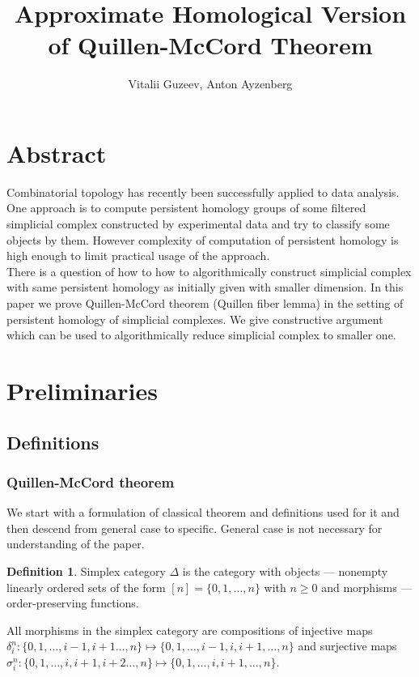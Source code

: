 \documentclass[a4paper, 12pt]{article}
\title{Approximate Homological Version of Quillen-McCord Theorem}
\author{Vitalii Guzeev, Anton Ayzenberg}
\theoremstyle{definition}
\newtheorem{definition}{Definition}
\theoremstyle{remark}
\begin{document}
\section{Abstract}

Combinatorial topology has recently been successfully applied to data analysis. One approach is to compute persistent homology groups of some filtered simplicial complex constructed by experimental data and try to classify some objects by them. However complexity of computation of persistent homology is high enough to limit practical usage of the approach.\\

There is a question of how to how to algorithmically construct simplicial complex with same persistent homology as initially given with smaller dimension. In this paper we prove Quillen-McCord theorem (Quillen fiber lemma) in the setting of persistent homology of simplicial complexes. We give constructive argument which can be used to algorithmically reduce simplicial complex to smaller one.

\section{Preliminaries}

\subsection{Definitions}

\subsubsection{Quillen-McCord theorem}

We start with a formulation of classical theorem and definitions used for it and then descend from general case to specific. General case is not necessary for understanding of the paper.\\

\begin{definition}
  Simplex category $\Delta$ is the category with objects --- nonempty linearly ordered sets of the form $[n] = \{0,1,\ldots,n\}$ with $n \geq 0$ and morphisms --- order-preserving functions.
\end{definition}

All morphisms in the simplex category are compositions of injective maps $\delta_i^n : \{0,1,\ldots,i-1,i+1\ldots,n\} \mapsto \{0,1,\ldots,i-1,i,i+1,\ldots,n\}$ and surjective maps $\sigma^n_i : \{0,1,\ldots,i,i+1,i+2\ldots,n\} \mapsto \{0,1,\ldots,i,i+1,\ldots,n\}$.
\end{document}
